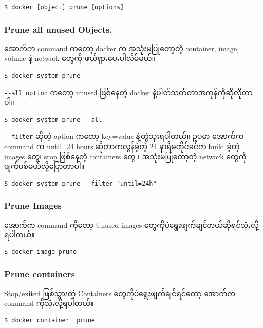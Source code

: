 \documentclass{article}
\begin{document}
\begin{verbatim}
$ docker [object] prune [options]
\end{verbatim}

\subsubsection{Prune all unused
Objects.}\label{prune-all-unused-objects.}

အောက်က command ကတော့ docker က အသုံးမပြုတော့တဲ့ container, image, volume
နဲ့ network တွေကို ဖယ်ရှားပေးပါလိမ့်မယ်။

\begin{verbatim}
$ docker system prune
\end{verbatim}

\texttt{-{}-‌all option} ကတော့ unused ဖြစ်နေတဲ့ docker
နဲ့ပါတ်သတ်တာအကုန်ကိုဆိုလိုတာပါ။

\begin{verbatim}
$ docker system prune --all
\end{verbatim}

\texttt{-{}-filter} ဆိုတဲ့ option ကတော့ key=value နဲ့တွဲသုံးရပါတယ်။ ဥပမာ
အောက်က command က until=24 hours ဆိုတာကလွန်ခဲ့တဲ့ 24 နာရီမတိုင်ခင်က build
ခဲ့တဲ့ images တွေ၊ stop ဖြစ်နေတဲ့ containers တွေ ၊ အသုံးမပြုတော့တဲ့
network တွေကိုဖျက်ပစ်မယ်လို့ပြောတာပါ။

\begin{verbatim}
$ docker system prune --filter "until=24h"
\end{verbatim}

\subsubsection{Prune Images}\label{prune-images}

အောက်က command ကိုတော့ Unused images
တွေကိုပဲရွေးဖျက်ချင်တယ်ဆိုရင်သုံးလို့ရပါတယ်။

\begin{verbatim}
$ docker image prune
\end{verbatim}

\subsubsection{Prune containers}\label{prune-containers}

Stop/exited ဖြစ်သွားတဲ့ Containers တွေကိုပဲရွေးဖျက်ချင်ရင်တော့ အောက်က
command ကိုသုံးလို့ရပါတယ်။

\begin{verbatim}
$ docker container  prune
\end{verbatim}
\end{document}
